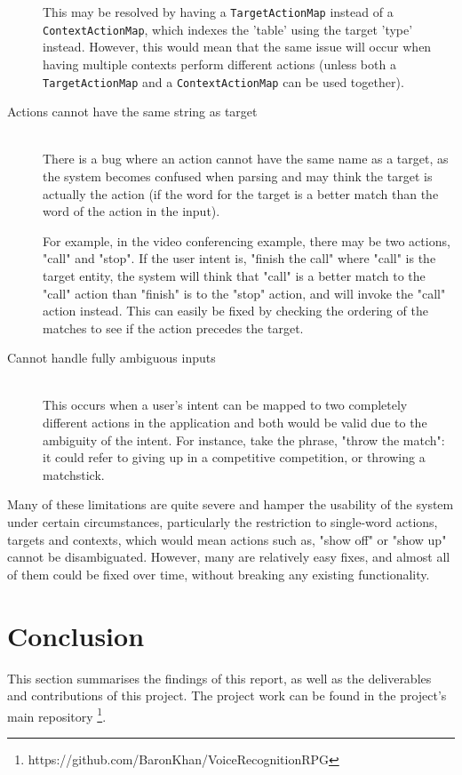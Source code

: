 \documentclass[11pt]{article}
\begin{document}
\begin{description}
	This may be resolved by having a \texttt{TargetActionMap} instead of a \texttt{ContextActionMap}, which indexes the 'table' using the target 'type' instead. However, this would mean that the same issue will occur when having multiple contexts perform different actions (unless both a \texttt{TargetActionMap} and a \texttt{ContextActionMap} can be used together).
\item[Actions cannot have the same string as target] \hfill
	\\ There is a bug where an action cannot have the same name as a target, as the system becomes confused when parsing and may think the target is actually the action (if the word for the target is a better match than the word of the action in the input).
	
	For example, in the video conferencing example, there may be two actions, "call" and "stop". If the user intent is, "finish the call" where "call" is the target entity, the system will think that "call" is a better match to the "call" action than "finish" is to the "stop" action, and will invoke the "call" action instead. This can easily be fixed by checking the ordering of the matches to see if the action precedes the target.
\item[Cannot handle fully ambiguous inputs] \hfill
	\\ This occurs when a user's intent can be mapped to two completely different actions in the application and both would be valid due to the ambiguity of the intent. For instance, take the phrase, "throw the match": it could refer to giving up in a competitive competition, or throwing a matchstick.
\end{description}

Many of these limitations are quite severe and hamper the usability of the system under certain circumstances, particularly the restriction to single-word actions, targets and contexts, which would mean actions such as, "show off" or "show up" cannot be disambiguated. However, many are relatively easy fixes, and almost all of them could be fixed over time, without breaking any existing functionality.

\newpage
\section{Conclusion}

This section summarises the findings of this report, as well as the deliverables and contributions of this project. The project work can be found in the project's main repository \footnote{https://github.com/BaronKhan/VoiceRecognitionRPG}.
\end{document}
